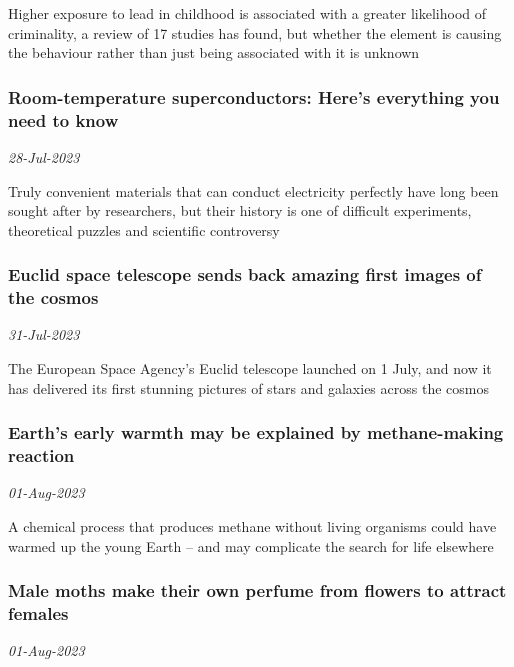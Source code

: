 Higher exposure to lead in childhood is associated with a greater likelihood of criminality, a review of 17 studies has found, but whether the element is causing the behaviour rather than just being associated with it is unknown
\subsubsection{Room-temperature superconductors: Here's everything you need to know \href{https://www.newscientist.com/article/2385270-room-temperature-superconductors-heres-everything-you-need-to-know/?utm_campaign=RSS%7CNSNS&utm_source=NSNS&utm_medium=RSS&utm_content=home}{\ding{225}}}
\textit{28-Jul-2023}

Truly convenient materials that can conduct electricity perfectly have long been sought after by researchers, but their history is one of difficult experiments, theoretical puzzles and scientific controversy
\subsubsection{Euclid space telescope sends back amazing first images of the cosmos \href{https://www.newscientist.com/article/2385424-euclid-space-telescope-sends-back-amazing-first-images-of-the-cosmos/?utm_campaign=RSS%7CNSNS&utm_source=NSNS&utm_medium=RSS&utm_content=home}{}}
\textit{31-Jul-2023}

The European Space Agency’s Euclid telescope launched on 1 July, and now it has delivered its first stunning pictures of stars and galaxies across the cosmos
\subsubsection{Earth's early warmth may be explained by methane-making reaction \href{https://www.newscientist.com/article/2385596-earths-early-warmth-may-be-explained-by-methane-making-reaction/?utm_campaign=RSS%7CNSNS&utm_source=NSNS&utm_medium=RSS&utm_content=home}{\ding{225}}}
\textit{01-Aug-2023}

A chemical process that produces methane without living organisms could have warmed up the young Earth – and may complicate the search for life elsewhere
\subsubsection{Male moths make their own perfume from flowers to attract females \href{https://www.newscientist.com/article/2385534-male-moths-make-their-own-perfume-from-flowers-to-attract-females/?utm_campaign=RSS%7CNSNS&utm_source=NSNS&utm_medium=RSS&utm_content=home}{}}
\textit{01-Aug-2023}

